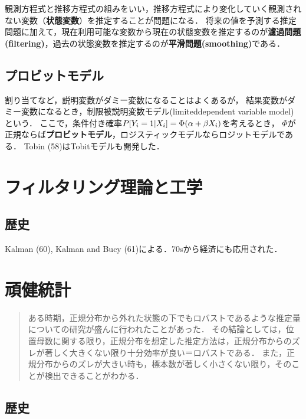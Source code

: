\documentclass[uplatex,dvipdfmx]{jsreport}
\begin{document}
観測方程式と推移方程式の組みをいい，推移方程式により変化していく観測されない変数（\textbf{状態変数}）を推定することが問題になる．
将来の値を予測する推定問題に加えて，現在利用可能な変数から現在の状態変数を推定するのが\textbf{濾過問題(filtering)}，過去の状態変数を推定するのが\textbf{平滑問題(smoothing)}である．

\section{プロビットモデル}

割り当てなど，説明変数がダミー変数になることはよくあるが，
結果変数がダミー変数になるとき，制限被説明変数モデル(limiteddependent variable model)という．
ここで，条件付き確率$P[Y_i=1|X_i]=\Phi(\alpha+\beta X_i)$を考えるとき，
$\Phi$が正規ならば\textbf{プロビットモデル}，ロジスティックモデルならロジットモデルである．
Tobin (58)はTobitモデルも開発した．

\chapter{フィルタリング理論と工学}

\section{歴史}

\begin{history}
    Kalman (60), Kalman and Bucy (61)による．70sから経済にも応用された．
\end{history}

\chapter{頑健統計}

\begin{quotation}
    ある時期，正規分布から外れた状態の下でもロバストであるような推定量についての研究が盛んに行われたことがあった．
    その結論としては，位置母数に関する限り，正規分布を想定した推定方法は，正規分布からのズレが著しく大きくない限り十分効率が良い＝ロバストである．
    また，正規分布からのズレが大きい時も，標本数が著しく小さくない限り，そのことが検出できることがわかる．
\end{quotation}

\section{歴史}
\end{document}
